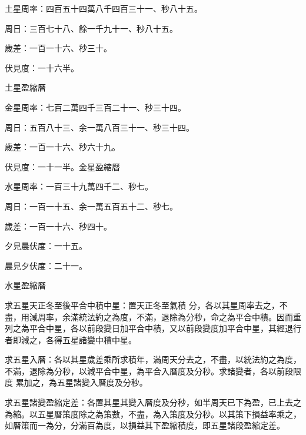 \begin{pinyinscope}
 土星周率：四百五十四萬八千四百三十一、秒八十五。



 周日：三百七十八、餘一千九十一、秒八十五。



 歲差：一百一十六、秒三十。



 伏見度：一十六半。



 土星盈縮曆



 金星周率：七百二萬四千三百二十一、秒三十四。



 周日：五百八十三、余一萬八百三十一、秒三十四。



 歲差：一百一十六、秒六十九。



 伏見度：一十一半。金星盈縮曆



 水星周率：一百三十九萬四千二、秒七。



 周日：一百一十五、余一萬五百五十二、秒七。



 歲差：一百一十六、秒四十。



 夕見晨伏度：一十五。



 晨見夕伏度：二十一。



 水星盈縮曆



 求五星天正冬至後平合中積中星：置天正冬至氣積
 分，各以其星周率去之，不盡，用減周率，余滿統法約之為度，不滿，退除為分秒，命之為平合中積。因而重列之為平合中星，各以前段變日加平合中積，又以前段變度加平合中星，其經退行者即減之，各得五星諸變中積中星。



 求五星入曆：各以其星歲差乘所求積年，滿周天分去之，不盡，以統法約之為度，不滿，退除為分秒，以減平合中星，為平合入曆度及分秒。求諸變者，各以前段限度
 累加之，為五星諸變入曆度及分秒。



 求五星諸變盈縮定差：各置其星其變入曆度及分秒，如半周天已下為盈，已上去之為縮。以五星曆策度除之為策數，不盡，為入策度及分秒。以其策下損益率乘之，如曆策而一為分，分滿百為度，以損益其下盈縮積度，即五星諸段盈縮定差。




\end{pinyinscope}
